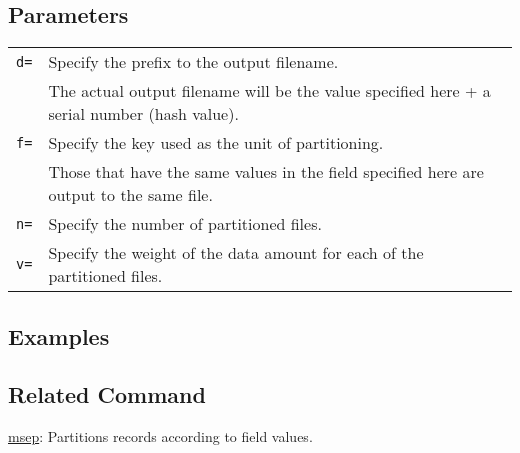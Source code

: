 \subsection*{Parameters}
\begin{table}[htbp]
{\small
\begin{tabular}{ll}
\verb|d=|      & Specify the prefix to the output filename.\\
               & The actual output filename will be the value specified here + a serial number (hash value).\\
\verb|f=|      & Specify the key used as the unit of partitioning.\\
               & Those that have the same values in the field specified here are output to the same file.\\
\verb|n=|      & Specify the number of partitioned files.\\
\verb|v=|      & Specify the weight of the data amount for each of the partitioned files.\\
\end{tabular} 
}
\end{table} 


\subsection*{Examples}


\subsection*{Related Command}
\hyperref[sect:msep]{msep}: Partitions records according to field values.

%

